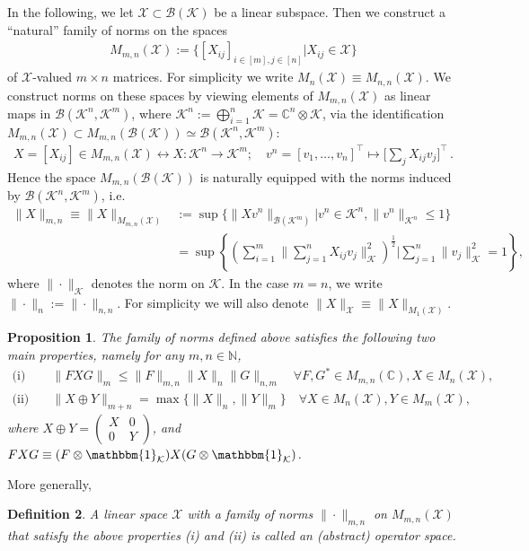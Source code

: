 \documentclass[11pt]{article}
\newcommand{\1}{\ensuremath{\mathbbm{1}}}
\theoremstyle{newdefinition}
\newtheorem{definition}{Definition}[section]
\theoremstyle{newplain}
\newtheorem{proposition}[definition]{Proposition}
\theoremstyle{myplain}
\begin{document}
In the following, we let $\mathcal{X}\subset\mathcal{B}(\mathcal{K})$ be a linear subspace. Then we construct a ``natural'' family of norms on the spaces 
\begin{align}
    M_{m,n}(\mathcal{X}):=\Big\{[X_{ij}]_{i\in[m],j\in[n]}|X_{ij}\in\mathcal{X}\Big\}
\end{align} of $\mathcal{X}$-valued  $m\times n$ matrices. For simplicity we write $M_{n}(\mathcal{X})\equiv M_{n,n}(\mathcal{X})$.
We construct norms on these spaces by viewing elements of $M_{m,n}(\mathcal{X})$ as linear maps in $\mathcal{B}(\mathcal{K}^n,\mathcal{K}^m)$, where $\mathcal{K}^n:=\bigoplus_{i=1}^n\mathcal{K}=\mathbb{C}^n\otimes\mathcal{K}$, via the identification $M_{m,n}(\mathcal{X})\subset M_{m,n}(\mathcal{B}(\mathcal{K}))\simeq \mathcal{B}(\mathcal{K}^n,\mathcal{K}^m)$:
\begin{align}
    X=[X_{ij}]\in M_{m,n}(\mathcal{X}) \leftrightarrow X:\mathcal{K}^n \to \mathcal{K}^m;\quad  v^n=[v_1,\dots, v_n]^\intercal\mapsto \Big[\sum_j X_{ij}v_j\Big]^\intercal\,.
\end{align}
Hence the space $M_{m,n}(\mathcal{B}(\mathcal{K}))$ is naturally equipped with the norms induced by $\mathcal{B}(\mathcal{K}^n,\mathcal{K}^m)$, i.e.
\begin{align} 
    \|X\|_{m,n}\equiv\|X\|_{M_{m,n}(\mathcal{X})}&:=\sup\{\|Xv^n\|_{\mathcal{B}(\mathcal{K}^m)}|v^n\in\mathcal{K}^n, \|v^n\|_{\mathcal{K}^n}\leq 1\} \label{equ:def.mxn.norm} \\ &= \sup\left\{\left(\sum_{i=1}^m\bigg\|\sum_{j=1}^nX_{ij}v_j\bigg\|_{\mathcal{K}}^2\right)^{\frac{1}{2}}\Bigg|\sum_{j=1}^n\|v_j\|_{\mathcal{K}}^2=1\right\},
\end{align} where $\|\cdot\|_{\mathcal{K}}$ denotes the norm on $\mathcal{K}$. In the case $m=n$, we write $\|\cdot\|_n:=\|\cdot\|_{n,n}$. 
For simplicity we will also denote $\|X\|_{\mathcal{X}}\equiv \|X\|_{M_1(\mathcal{X})}$.
\begin{proposition} \label{prop:central.properties.OSnorms}
The family of norms defined above satisfies the following two main properties, namely for any $m,n\in\mathbb{N}$,
\begin{align}
\text{(i)} \quad & \|FXG\|_m \leq \|F\|_{m,n}\|X\|_n\|G\|_{n,m} \quad \forall F,G^*\in M_{m,n}(\mathbb{C}), X\in M_n(\mathcal{X}), \\
\text{(ii)} \quad & \|X\oplus Y\|_{m+n} = \max\{\|X\|_n,\|Y\|_m\} \quad \forall X\in M_n(\mathcal{X}), Y\in M_m(\mathcal{X}),
\end{align} where 
$X\oplus Y= \begin{pmatrix}
    X & 0 \\
    0 & Y
\end{pmatrix}$, and $FXG\equiv (F\otimes \1_\mathcal{K})X(G\otimes \1_\mathcal{K})$.
\end{proposition}
More generally,
\begin{definition} A linear space $\mathcal{X}$ with a family of norms $\|\cdot \|_{m,n}$ on $M_{m,n}(\mathcal
X)$ that satisfy the above properties (i) and (ii) is called an \textit{(abstract) operator space}.
\end{definition}
\end{document}
